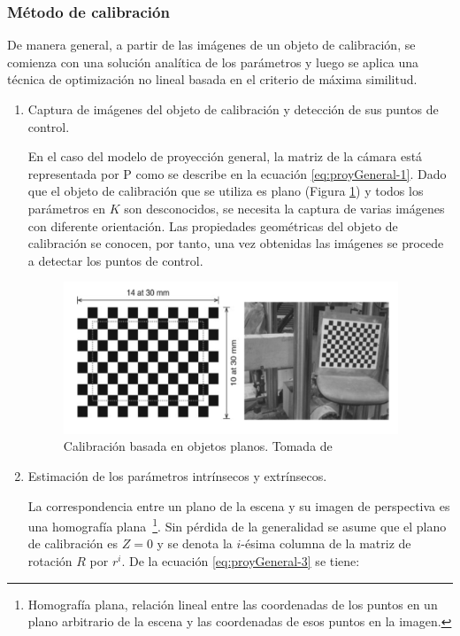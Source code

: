 \subsubsection{Método de calibración}

De manera general, a partir de las imágenes de un objeto de calibración, se comienza con una solución analítica de los parámetros y luego se aplica una técnica de optimización no lineal basada en el criterio de máxima similitud.

\begin{enumerate}
	\item Captura de imágenes del objeto de calibración y detección de sus puntos de control.
	
	En el caso del modelo de proyección general, la matriz de la cámara está representada por P como se describe en la ecuación \ref{eq:proyGeneral-1}. Dado que el objeto de calibración que se utiliza es plano (Figura \ref{fig:chess}) y todos los parámetros en $K$ son desconocidos, se necesita la captura de varias imágenes con diferente orientación. Las propiedades geométricas del objeto de calibración se conocen, por tanto, una vez obtenidas las imágenes se procede a detectar los puntos de control.
	
	\begin{figure}[h]
		\centering
		\includegraphics[width=10cm]{./Graphics/chess.png}
		\caption{Calibración basada en objetos planos. Tomada de \cite{ching2022segm3d}}
		\label{fig:chess}
	\end{figure}
	\item Estimación de los parámetros intrínsecos y extrínsecos.
	
	La correspondencia entre un plano de la escena y su imagen de perspectiva es una homografía plana~\footnote{Homografía plana, relación lineal entre las coordenadas de los puntos en un plano arbitrario de la escena y las coordenadas de esos puntos en la imagen.}. Sin pérdida de la generalidad se asume que el plano de calibración es $Z = 0$ y se denota la $i$-ésima columna de la matriz de rotación $R$ por $r^i$. De la ecuación \ref{eq:proyGeneral-3} se tiene:
	

\end{enumerate}

